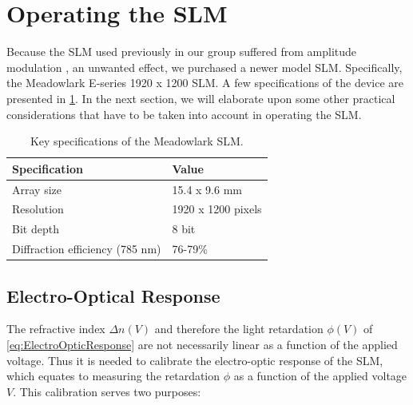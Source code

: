 \section{Operating the SLM}\label{sec:SLMoperatoin}

Because the SLM used previously in our group suffered from amplitude modulation \cite{Bijnen2015,Dijk2012}, an unwanted effect, we purchased a newer model SLM. Specifically, the Meadowlark E-series 1920 x 1200 SLM.
A few specifications of the device are presented in \cref{table:SLMspecs}.
In the next section, we will elaborate upon some other practical considerations that have to be taken into account in operating the SLM.

\begin{table}[h]
    \centering
    \caption{Key specifications of the Meadowlark SLM.}
    \label{table:SLMspecs}
    \begin{tabular}{l | l}
        \textbf{Specification}              & \textbf{Value}        \\ \hline 
        Array size                          & 15.4 x 9.6 mm         \\ \hline
        Resolution                          & 1920 x 1200 pixels    \\ \hline
        Bit depth                           & 8 bit                 \\ \hline
        Diffraction efficiency (785 nm)  & 76-79\%   
    \end{tabular}
\end{table}


\subsection{Electro-Optical Response}

The refractive index $\Delta n(V)$ and therefore the light retardation $\phi(V)$ of \cref{eq:ElectroOpticResponse} are not necessarily linear as a function of the applied voltage.
Thus it is needed to calibrate the electro-optic response of the \ac{SLM}, which equates to measuring the retardation $\phi$ as a function of the applied voltage $V$. 
This calibration serves two purposes:

